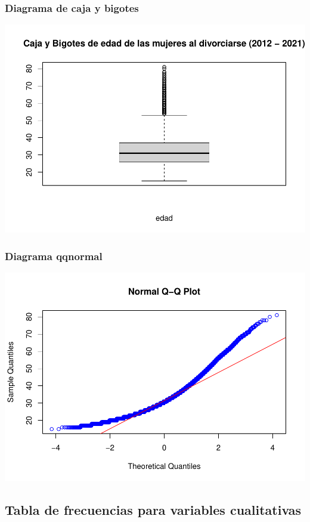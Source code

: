 \documentclass[
]{article}
\begin{document}
\hypertarget{diagrama-de-caja-y-bigotes-1}{%
\subsubsection{Diagrama de caja y
bigotes}\label{diagrama-de-caja-y-bigotes-1}}

\includegraphics{Proyecto_files/figure-latex/normalBoxEdadMujer-1.pdf}

\hypertarget{diagrama-qqnormal-1}{%
\subsubsection{Diagrama qqnormal}\label{diagrama-qqnormal-1}}

\includegraphics{Proyecto_files/figure-latex/normalQQEdadMujer-1.pdf}

\hypertarget{tabla-de-frecuencias-para-variables-cualitativas}{%
\subsection{Tabla de frecuencias para variables
cualitativas}\label{tabla-de-frecuencias-para-variables-cualitativas}}
\end{document}
